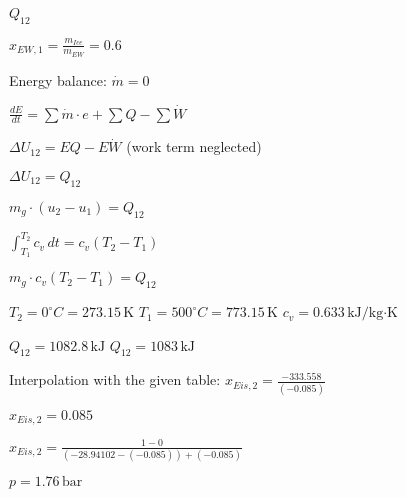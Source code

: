 \( Q_{12} \)  

\( x_{EW,1} = \frac{m_{Ice}}{m_{EW}} = 0.6 \)  

Energy balance:  
\( \dot{m} = 0 \)  

\( \frac{dE}{dt} = \sum \dot{m} \cdot e + \sum Q - \sum \dot{W} \)  

\( \Delta U_{12} = EQ - E \dot{W} \) (work term neglected)  

\( \Delta U_{12} = Q_{12} \)  

\( m_g \cdot (u_2 - u_1) = Q_{12} \)  

\( \int_{T_1}^{T_2} c_v \, dt = c_v (T_2 - T_1) \)  

\( m_g \cdot c_v (T_2 - T_1) = Q_{12} \)  

\( T_2 = 0^\circ C = 273.15 \, \text{K} \)  
\( T_1 = 500^\circ C = 773.15 \, \text{K} \)  
\( c_v = 0.633 \, \text{kJ/kg·K} \)  

\( Q_{12} = 1082.8 \, \text{kJ} \)  
\( Q_{12} = 1083 \, \text{kJ} \)

Interpolation with the given table:  
\( x_{Eis,2} = \frac{-333.558}{(-0.085)} \)  

\( x_{Eis,2} = 0.085 \)  

\( x_{Eis,2} = \frac{1 - 0}{(-28.94102 - (-0.085)) + (-0.085)} \)  

\( p = 1.76 \, \text{bar} \)